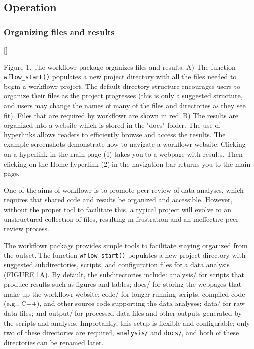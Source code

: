 \documentclass[9pt,a4paper]{extarticle}
\begin{document}
\subsection*{Operation}

\subsubsection*{Organizing files and results}

[]

Figure 1. The workflowr package organizes files and results. A) The
function \verb|wflow_start()| populates a new project directory with all the
files needed to begin a workflowr project. The default directory
structure encourages users to organize their files as the project
progresses (this is only a suggested structure, and users may change the
names of many of the files and directories as they see fit). Files that
are required by workflowr are shown in red. B) The results are organized
into a website which is stored in the "docs" folder. The use of
hyperlinks allows readers to efficiently browse and access the results.
The example screenshots demonstrate how to navigate a workflowr website.
Clicking on a hyperlink in the main page (1) takes you to a webpage with
results. Then clicking on the Home hyperlink (2) in the navigation bar
returns you to the main page.

One of the aims of workflowr is to promote peer review of data analyses,
which requires that shared code and results be organized and accessible.
However, without the proper tool to facilitate this, a typical project
will evolve to an unstructured collection of files, resulting in
frustration and an ineffective peer review process.

The workflowr package provides simple tools to facilitate staying
organized from the outset. The function \verb|wflow_start()| populates a new
project directory with suggested subdirectories, scripts, and
configuration files for a data analysis (FIGURE 1A). By default, the
subdirectories include: analysis/ for scripts that produce results such
as figures and tables; docs/ for storing the webpages that make up the
workflowr website; code/ for longer running scripts, compiled code
(e.g., C++), and other source code supporting the data analyses; data/
for raw data files; and output/ for processed data files and other
outputs generated by the scripts and analyses. Importantly, this setup
is flexible and configurable; only two of these directories are
required, \verb|analysis/| and \verb|docs/|, and both of these
directories can be renamed later.
\end{document}
